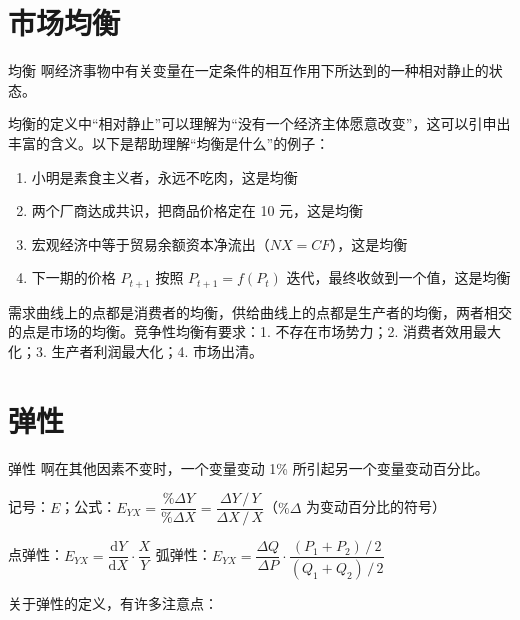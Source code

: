\section{市场均衡}

\begin{definition}[breakable]{均衡}
    啊经济事物中有关变量在一定条件的相互作用下所达到的一种相对静止的状态。
\end{definition}

均衡的定义中“相对静止”可以理解为“没有一个经济主体愿意改变”，这可以引申出丰富的含义。以下是帮助理解“均衡是什么”的例子：

\begin{enumerate}
    \item 小明是素食主义者，永远不吃肉，这是均衡
    \item 两个厂商达成共识，把商品价格定在 10 元，这是均衡
    \item 宏观经济中等于贸易余额资本净流出（$NX=CF$），这是均衡
    \item 下一期的价格 $P_{t+1}$ 按照 $P_{t+1}=f\left(P_t\right)$ 迭代，最终收敛到一个值，这是均衡
\end{enumerate}

需求曲线上的点都是消费者的均衡，供给曲线上的点都是生产者的均衡，两者相交的点是市场的均衡。竞争性均衡有要求：1. 不存在市场势力；2. 消费者效用最大化；3. 生产者利润最大化；4. 市场出清。

\section{弹性}

\begin{definition}[breakable]{弹性}
    啊在其他因素不变时，一个变量变动 1\% 所引起另一个变量变动百分比。
    \vspace{0.5em}
    
    记号：$E$；公式：$E_{YX}=\dfrac{\%\Delta Y}{\%\Delta X}=\dfrac{\Delta Y\,/\,Y}{\Delta X\,/\,X}$（$\%\Delta$ 为变动百分比的符号）
    \vspace{0.5em}
    
    点弹性：$E_{YX}=\dfrac{\mathrm dY}{\mathrm dX}\cdot\dfrac XY$ \quad\quad 弧弹性：$E_{YX}=\dfrac{\Delta Q}{\Delta P}\cdot\dfrac{\left(P_1+P_2\right)\,/\,2}{\left(Q_1+Q_2\right)\,/\,2}$
\end{definition}

关于弹性的定义，有许多注意点：


